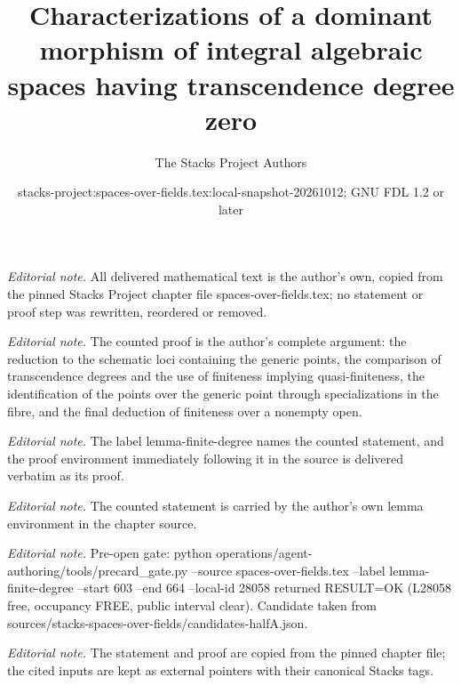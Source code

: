 \documentclass[10pt,a4paper]{amsart}
\title{Characterizations of a dominant morphism of integral algebraic spaces having transcendence degree zero}
\author{The Stacks Project Authors}
\date{stacks-project:spaces-over-fields.tex:local-snapshot-20261012; GNU FDL 1.2 or later}
\theoremstyle{plain}
\theoremstyle{definition}
\theoremstyle{remark}
\numberwithin{equation}{subsection}
\begin{document}
\maketitle
\noindent\textit{Editorial note.} All delivered mathematical text is the author's own, copied from the pinned Stacks Project chapter file spaces-over-fields.tex; no statement or proof step was rewritten, reordered or removed.\par\medskip
\noindent\textit{Editorial note.} The counted proof is the author's complete argument: the reduction to the schematic loci containing the generic points, the comparison of transcendence degrees and the use of finiteness implying quasi-finiteness, the identification of the points over the generic point through specializations in the fibre, and the final deduction of finiteness over a nonempty open.\par\medskip
\noindent\textit{Editorial note.} The label lemma-finite-degree names the counted statement, and the proof environment immediately following it in the source is delivered verbatim as its proof.\par\medskip
\noindent\textit{Editorial note.} The counted statement is carried by the author's own lemma environment in the chapter source.\par\medskip
\noindent\textit{Editorial note.} Pre-open gate: python operations/agent-authoring/tools/precard\_gate.py --source spaces-over-fields.tex --label lemma-finite-degree --start 603 --end 664 --local-id 28058 returned RESULT=OK (L28058 free, occupancy FREE, public interval clear). Candidate taken from sources/stacks-spaces-over-fields/candidates-halfA.json.\par\medskip
\noindent\textit{Editorial note.} The statement and proof are copied from the pinned chapter file; the cited inputs are kept as external pointers with their canonical Stacks tags.\par\medskip
\end{document}
